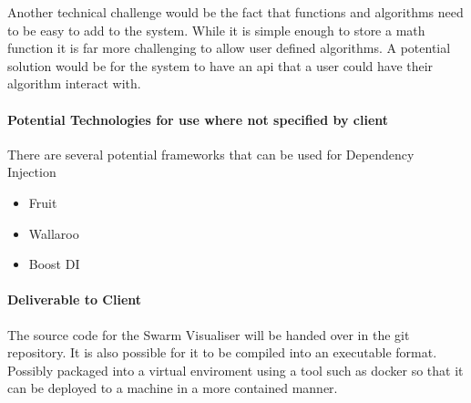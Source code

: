 \documentclass[12pt]{article}
\begin{document}
Another technical challenge would be the fact that functions and algorithms need to be easy to add to the system. While it is simple enough to store a math function it is far more challenging to allow user defined algorithms. A potential solution would be for the system to have an api that a user could have their algorithm interact with.

\paragraph{Potential Technologies for use where not specified by client}
There are several potential frameworks that can be used for Dependency Injection
\begin{itemize}
	\item Fruit
	\item Wallaroo
	\item Boost DI
\end{itemize}

\paragraph{Deliverable to Client}
The source code for the Swarm Visualiser will be handed over in the git repository. It is also possible for it to be compiled into an executable format. Possibly packaged into a virtual enviroment using a tool such as docker so that it can be deployed to a machine in a more contained manner. 
\end{document}
